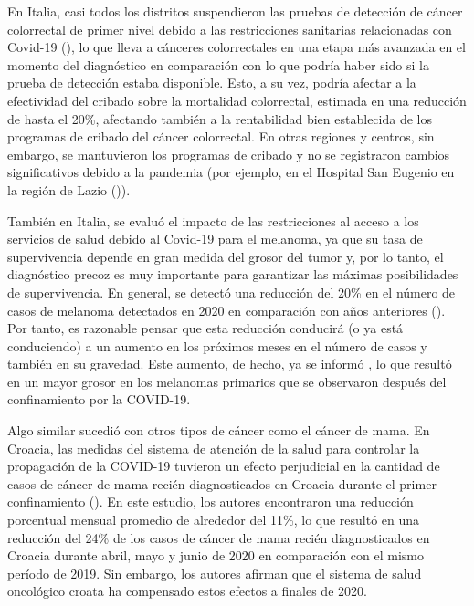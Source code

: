 \documentclass[12pt,twoside]{article} %
\begin{document}
En Italia, casi todos los distritos suspendieron las pruebas de detección de cáncer colorrectal de primer nivel debido a las restricciones sanitarias relacionadas con Covid-19 (\cite{del_vecchio_blanco_impact_2020}), lo que lleva a cánceres colorrectales en una etapa más avanzada en el momento del diagnóstico en comparación con lo que podría haber sido si la prueba de detección estaba disponible. Esto, a su vez, podría afectar a la efectividad del cribado sobre la mortalidad colorrectal, estimada en una reducción de hasta el 20\%, afectando también a la rentabilidad bien establecida de los programas de cribado del cáncer colorrectal. En otras regiones y centros, sin embargo, se mantuvieron los programas de cribado y no se registraron cambios significativos debido a la pandemia (por ejemplo, en el Hospital San Eugenio en la región de Lazio (\cite{dovidio_impact_2021})).

También en Italia, se evaluó el impacto de las restricciones al acceso a los servicios de salud debido al Covid-19 para el melanoma, ya que su tasa de supervivencia depende en gran medida del grosor del tumor y, por lo tanto, el diagnóstico precoz es muy importante para garantizar las máximas posibilidades de supervivencia. En general, se detectó una reducción del 20\% en el número de casos de melanoma detectados en 2020 en comparación con años anteriores (\cite{gualdi_effect_2021}). Por tanto, es razonable pensar que esta reducción conducirá (o ya está conduciendo) a un aumento en los próximos meses en el número de casos y también en su gravedad. Este aumento, de hecho, ya se informó \cite{ricci_delayed_2020}, lo que resultó en un mayor grosor en los melanomas primarios que se observaron después del confinamiento por la COVID-19.

Algo similar sucedió con otros tipos de cáncer como el cáncer de mama. En Croacia, las medidas del sistema de atención de la salud para controlar la propagación de la COVID-19 tuvieron un efecto perjudicial en la cantidad de casos de cáncer de mama recién diagnosticados en Croacia durante el primer confinamiento (\cite{vrdoljak_covid-19_2021}). En este estudio, los autores encontraron una reducción porcentual mensual promedio de alrededor del 11\%, lo que resultó en una reducción del 24\% de los casos de cáncer de mama recién diagnosticados en Croacia durante abril, mayo y junio de 2020 en comparación con el mismo período de 2019. Sin embargo, los autores afirman que el sistema de salud oncológico croata ha compensado estos efectos a finales de 2020.
\end{document}
